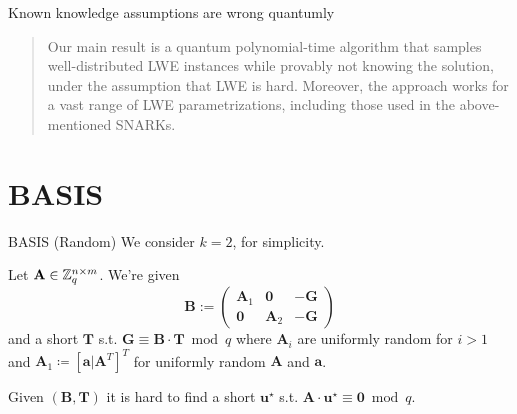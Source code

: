 \documentclass[xcolor=table,10pt,aspectratio=169]{beamer}
\renewcommand{\vec}[1]{\ensuremath{\mathbf{#1}}\xspace}
\providecommand{\mat}[1]{\ensuremath{\vec{#1}}\xspace}
\begin{document}
\begin{frame}[label={sec:orgd0ce448}]{Known knowledge assumptions are wrong quantumly}
\begin{quote}
Our main result is a quantum polynomial-time algorithm that samples well-distributed LWE instances while provably not knowing the solution, under the assumption that LWE is hard. Moreover, the approach works for a vast range of LWE parametrizations, including those used in the above-mentioned SNARKs.
\end{quote}

\end{frame}

\section{BASIS}
\label{sec:org5b97632}
\begin{frame}[label={sec:org37535a8}]{BASIS (Random)}
We consider \(k=2\), for simplicity.

\begin{definition}
Let \(\mat{A} \in \ZZ_{q}^{n \times m}\). We're given
\[
\vec{B} := \begin{pmatrix}\mat{A}_{1} & \vec{0} & - \vec{G}\\\vec{0} & \mat{A}_{2} & -\vec{G}\end{pmatrix}
\] and a short \(\vec{T}\) s.t. \(\vec{G} \equiv \vec{B} \cdot \vec{T} \bmod q\)
where \(\mat{A}_{i}\) are uniformly random for \(i>1\) and \(\mat{A}_{1} \coloneqq  [\vec{a} | \mat{A}^{T}]^{T}\) for uniformly random \(\mat{A}\) and \(\vec{a}\).

Given \((\vec{B}, \vec{T})\) it is hard to find a short \(\vec{u}^{\star}\) s.t. \(\mat{A} \cdot \vec{u}^{\star} \equiv \vec{0} \bmod q\).
\end{definition}

{\footnotesize {} \par}
\end{frame}
\end{document}
